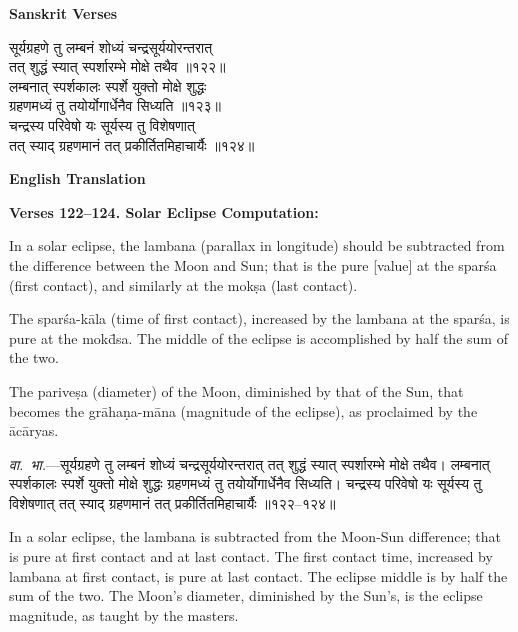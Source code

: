 \documentclass[11pt,a4paper]{article}
\begin{document}
\begin{minipage}[t]{0.48\textwidth}
\textbf{\small Sanskrit Verses}

\small\devanagarifont
सूर्यग्रहणे तु लम्बनं शोध्यं चन्द्रसूर्ययोरन्तरात्\\
तत् शुद्धं स्यात् स्पर्शारम्भे मोक्षे तथैव ॥१२२॥\\[0.5em]
लम्बनात् स्पर्शकालः स्पर्शे युक्तो मोक्षे शुद्धः\\
ग्रहणमध्यं तु तयोर्योगार्धेनैव सिध्यति ॥१२३॥\\[0.5em]
चन्द्रस्य परिवेषो यः सूर्यस्य तु विशेषणात्\\
तत् स्याद् ग्रहणमानं तत् प्रकीर्तितमिहाचार्यैः ॥१२४॥
\end{minipage}%
\hfill
\begin{minipage}[t]{0.48\textwidth}
\textbf{\small English Translation}

\textbf{Verses 122--124. Solar Eclipse Computation:}

In a solar eclipse, the lambana (parallax in longitude) should be subtracted from the difference between the Moon and Sun; that is the pure [value] at the spar\'sa (first contact), and similarly at the mok\d{s}a (last contact).

The spar\'sa-k\=ala (time of first contact), increased by the lambana at the spar\'sa, is pure at the mok\=dsa. The middle of the eclipse is accomplished by half the sum of the two.

The parive\d{s}a (diameter) of the Moon, diminished by that of the Sun, that becomes the gr\=aha\d{n}a-m\=ana (magnitude of the eclipse), as proclaimed by the \=ac\=aryas.
\end{minipage}

\vspace{0.5em}
\begin{minipage}[t]{0.48\textwidth}
\small\devanagarifont
\textit{वा.~भा.}---सूर्यग्रहणे तु लम्बनं शोध्यं चन्द्रसूर्ययोरन्तरात् तत् शुद्धं स्यात् स्पर्शारम्भे मोक्षे तथैव। लम्बनात् स्पर्शकालः स्पर्शे युक्तो मोक्षे शुद्धः ग्रहणमध्यं तु तयोर्योगार्धेनैव सिध्यति। चन्द्रस्य परिवेषो यः सूर्यस्य तु विशेषणात् तत् स्याद् ग्रहणमानं तत् प्रकीर्तितमिहाचार्यैः ॥१२२--१२४॥
\end{minipage}%
\hfill
\begin{minipage}[t]{0.48\textwidth}
\small
In a solar eclipse, the lambana is subtracted from the Moon-Sun difference; that is pure at first contact and at last contact. The first contact time, increased by lambana at first contact, is pure at last contact. The eclipse middle is by half the sum of the two. The Moon's diameter, diminished by the Sun's, is the eclipse magnitude, as taught by the masters.
\end{minipage}
\end{document}
